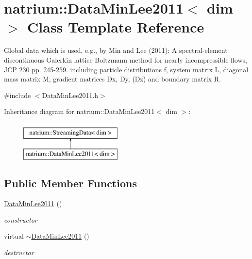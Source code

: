 \hypertarget{classnatrium_1_1DataMinLee2011}{\section{natrium\-:\-:\-Data\-Min\-Lee2011$<$ dim $>$ \-Class \-Template \-Reference}
\label{classnatrium_1_1DataMinLee2011}
}


\-Global data which is used, e.\-g., by \-Min and \-Lee (2011)\-: \-A spectral-\/element discontinuous \-Galerkin lattice \-Boltzmann method for nearly incompressible flows, \-J\-C\-P 230 pp. 245-\/259. including particle distributions f, system matrix \-L, diagonal mass matrix \-M, gradient matrices \-Dx, \-Dy, (\-Dz) and boundary matrix \-R.  




{\ttfamily \#include $<$\-Data\-Min\-Lee2011.\-h$>$}

\-Inheritance diagram for natrium\-:\-:\-Data\-Min\-Lee2011$<$ dim $>$\-:\begin{figure}[H]
\begin{center}
\leavevmode
\includegraphics[height=2.000000cm]{classnatrium_1_1DataMinLee2011}
\end{center}
\end{figure}
\subsection*{\-Public \-Member \-Functions}
\begin{DoxyCompactItemize}
\item 
\hypertarget{classnatrium_1_1DataMinLee2011_aaaae9305f9878aa2f2e19dfd2293ebdc}{\hyperlink{classnatrium_1_1DataMinLee2011_aaaae9305f9878aa2f2e19dfd2293ebdc}{\-Data\-Min\-Lee2011} ()}\label{classnatrium_1_1DataMinLee2011_aaaae9305f9878aa2f2e19dfd2293ebdc}

\begin{DoxyCompactList}\small\item\em constructor \end{DoxyCompactList}\item 
\hypertarget{classnatrium_1_1DataMinLee2011_a248508156e259f7278e7770d9e3c4c98}{virtual \hyperlink{classnatrium_1_1DataMinLee2011_a248508156e259f7278e7770d9e3c4c98}{$\sim$\-Data\-Min\-Lee2011} ()}\label{classnatrium_1_1DataMinLee2011_a248508156e259f7278e7770d9e3c4c98}

\begin{DoxyCompactList}\small\item\em destructor \end{DoxyCompactList}\end{DoxyCompactItemize}


